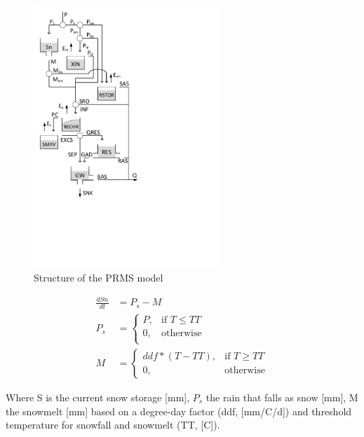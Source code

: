 { 																	%
\begin{figure}
\includegraphics[trim=1cm 8cm 7cm 1cm,width=7cm,keepaspectratio]{./files/45_schematic.pdf}
\caption{Structure of the PRMS model} \label{fig:45_schematic}
\end{figure}

\begin{align}
	\frac{dSn}{dt} &= P_s-M \\
	P_s &= \begin{cases}
		P, &\text{if } T \leq TT \\
		0, & \text{otherwise} \\
	\end{cases} \\
	M &= 
	\begin{cases}
		ddf*(T - TT), & \text{if } T \geq TT \\
		0, & \text{otherwise}
	\end{cases}
\end{align}

Where S is the current snow storage [mm], $P_s$ the rain that falls as snow [mm], M the snowmelt [mm] based on a degree-day factor (ddf, [mm/\degree C/d]) and threshold temperature for snowfall and snowmelt (TT, [\degree C]).

} %

